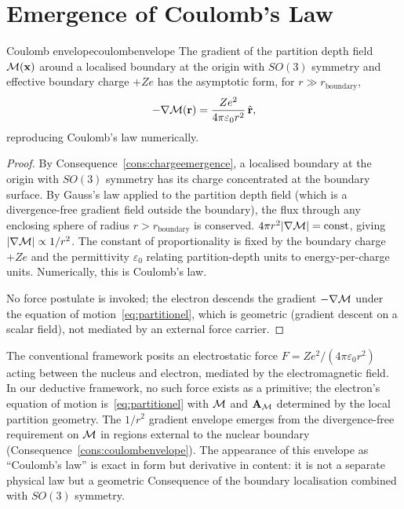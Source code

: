 \section{Emergence of Coulomb's Law}
\label{sec:coulombenvelope}

\begin{consequence}{Coulomb envelope}{coulombenvelope}
The gradient of the partition depth field $\mathcal{M}(\mathbf{x})$ around a localised boundary at the origin with $SO(3)$ symmetry and effective boundary charge $+Ze$ has the asymptotic form, for $r\gg r_{\text{boundary}}$,
\begin{equation}
-\nabla\mathcal{M}(\mathbf{r})=\frac{Ze^{2}}{4\pi\varepsilon_{0}r^{2}}\,\hat{\mathbf{r}},
\label{eq:coulombenvelope}
\end{equation}
reproducing Coulomb's law numerically.
\end{consequence}

\begin{proof}
By Consequence~\ref{cons:chargeemergence}, a localised boundary at the origin with $SO(3)$ symmetry has its charge concentrated at the boundary surface. By Gauss's law applied to the partition depth field (which is a divergence-free gradient field outside the boundary), the flux through any enclosing sphere of radius $r>r_{\text{boundary}}$ is conserved. $4\pi r^{2}|\nabla\mathcal{M}|=\text{const}$, giving $|\nabla\mathcal{M}|\propto 1/r^{2}$. The constant of proportionality is fixed by the boundary charge $+Ze$ and the permittivity $\varepsilon_{0}$ relating partition-depth units to energy-per-charge units. Numerically, this is Coulomb's law.

No force postulate is invoked; the electron descends the gradient $-\nabla\mathcal{M}$ under the equation of motion~\eqref{eq:partitionel}, which is geometric (gradient descent on a scalar field), not mediated by an external force carrier.
\end{proof}

\begin{remark}
The conventional framework posits an electrostatic force $F=Ze^{2}/(4\pi\varepsilon_{0}r^{2})$ acting between the nucleus and electron, mediated by the electromagnetic field. In our deductive framework, no such force exists as a primitive; the electron's equation of motion is~\eqref{eq:partitionel} with $\mathcal{M}$ and $\mathbf{A}_{\mathcal{M}}$ determined by the local partition geometry. The $1/r^{2}$ gradient envelope emerges from the divergence-free requirement on $\mathcal{M}$ in regions external to the nuclear boundary (Consequence~\ref{cons:coulombenvelope}). The appearance of this envelope as ``Coulomb's law'' is exact in form but derivative in content: it is not a separate physical law but a geometric Consequence of the boundary localisation combined with $SO(3)$ symmetry.
\end{remark}

